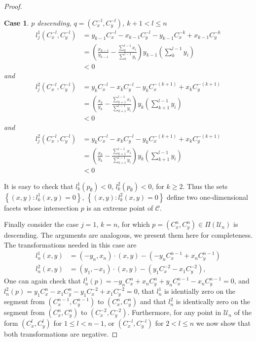 \documentclass{article}
\theoremstyle{case}
\newtheorem{case}{Case}
\begin{document}
\begin{proof}
%
%
\begin{case} $p$ descending, $q = \left( C_x^{-l}, C_y^{-l}\right)$, $k+1 < l \leq n$
\begin{align*}
l_j^1\left(C_x^{-l}, C_y^{-l}\right) &= y_{k-1}C_x^{-l} - x_{k-1}C_y^{-l} - y_{k-1}C_x^{-k} + x_{k-1}C_y^{-k} \\
&= \left( \frac{x_{k-1}}{y_{k-1}} - \frac{\sum_k^{l-1} x_i}{\sum_k^{l-1} y_i}\right)y_{k-1}\left( \sum_k^{l-1}y_i\right) \\
&< 0
\end{align*}
and
\begin{align*}
l_j^2\left(C_x^{-l}, C_y^{-l}\right) &= y_kC_x^{-l} - x_kC_y^{-l} - y_kC_x^{-(k+1)} + x_kC_y^{-(k+1)} \\
&= \left( \frac{x_k}{y_k} - \frac{\sum_{k+1}^{l-1}x_i}{\sum_{k+1}^{l-1}y_i}\right)y_k\left( \sum_{k+1}^{l-1} y_i\right) \\
&< 0
\end{align*}
and 
\begin{align*}
l_j^2\left(C_x^{-l}, C_y^{-l}\right) &= y_kC_x^{-l} - x_kC_y^{-l} - y_kC_x^{-(k+1)} + x_kC_y^{-(k+1)} \\
&= \left( \frac{x_k}{y_k} - \frac{\sum_{k+1}^{l-1}x_i}{\sum_{k+1}^{l-1}y_i}\right)y_k\left( \sum_{k+1}^{l-1}y_i\right) \\
&< 0
\end{align*}
\end{case}

\noindent It is easy to check that $l_k^1\left( p_{\emptyset}\right) <0$, $l_k^2\left( p_{\emptyset}\right) < 0$, for $k \geq 2$. Thus the sets $\left\lbrace \left( x,y\right) \colon l_k^1\left( x,y\right) = 0\right\rbrace$, $\left\lbrace \left( x,y\right) \colon l_k^2\left( x,y\right) = 0\right\rbrace$ define two one-dimensional facets whose intersection $p$ is an extreme point of $\mathcal{C}$.

Finally consider the case $j = 1$, $k = n$, for which $p =\left( C_x^n, C_y^n \right) \in \Pi\left( \mathcal{U}_n\right)$ is descending. The arguments are analogous, we present them here for completeness. The transformations needed in this case are
\begin{align*}
l_n^1\left( x,y\right) &= \left( -y_n, x_n\right) \cdot \left( x,y\right) - \left( -y_nC_x^{n-1} + x_nC_y^{n-1}\right) \\
l_n^2\left( x,y\right) &= \left( y_1, -x_1\right) \cdot \left( x,y\right) - \left( y_1C_x^{-2} - x_1C_y^{-2}\right),
\end{align*}
One can again check that $l_n^1\left( p\right) = -y_nC_x^n + x_nC_y^n + y_nC_x^{n-1} - x_nC_y^{n-1} = 0$, and $l_n^2\left( p\right) = y_1C_x^n - x_1C_y^n - y_1C_x^{-2} + x_1C_y^{-2} = 0$, that $l_n^1$ is identially zero on the segment from $\left( C_x^{n-1}, C_y^{n-1}\right)$ to $\left( C_x^n, C_y^n\right)$ and that $l_n^2$ is identically zero on the segment from $\left( C_x^n, C_y^n\right)$ to $\left( C_x^{-2}, C_y^{-2}\right)$. Furthermore, for any point in $\mathcal{U}_n$ of the form $\left( C_x^l, C_y^l\right)$ for $1 \leq l < n-1$, or $\left( C_x^{-l}, C_y^{-l}\right)$ for $2 < l \leq n$ we now show that both transformations are negative.


\end{proof}
\end{document}
